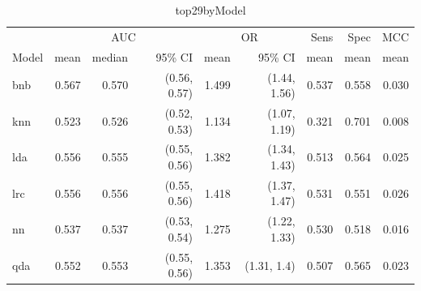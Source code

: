 \begin{table}[H]
\centering
    \begin{footnotesize}
\caption{top29byModel}
\label{tab:top29byModel_m}
\begin{tabular}{l|rrrrrrrr}
\toprule
 & \multicolumn{3}{c|}{AUC} & \multicolumn{2}{c|}{OR} & Sens & Spec & MCC \\ Model & mean & median & 95\% CI & mean & 95\% CI & mean & mean & mean \\ 
\midrule
bnb & {\cellcolor[HTML]{00441B}} \color[HTML]{F1F1F1} 0.567 & {\cellcolor[HTML]{00441B}} \color[HTML]{F1F1F1} 0.570 & (0.56, 0.57) & {\cellcolor[HTML]{00441B}} \color[HTML]{F1F1F1} 1.499 & (1.44, 1.56) & {\cellcolor[HTML]{004C1E}} \color[HTML]{F1F1F1} 0.537 & {\cellcolor[HTML]{CEECC8}} \color[HTML]{000000} 0.558 & {\cellcolor[HTML]{00441B}} \color[HTML]{F1F1F1} 0.030 \\
knn & {\cellcolor[HTML]{F7FCF5}} \color[HTML]{000000} 0.523 & {\cellcolor[HTML]{F7FCF5}} \color[HTML]{000000} 0.526 & (0.52, 0.53) & {\cellcolor[HTML]{F7FCF5}} \color[HTML]{000000} 1.134 & (1.07, 1.19) & {\cellcolor[HTML]{F7FCF5}} \color[HTML]{000000} 0.321 & {\cellcolor[HTML]{00441B}} \color[HTML]{F1F1F1} 0.701 & {\cellcolor[HTML]{F7FCF5}} \color[HTML]{000000} 0.008 \\
lda & {\cellcolor[HTML]{218944}} \color[HTML]{F1F1F1} 0.556 & {\cellcolor[HTML]{39A257}} \color[HTML]{F1F1F1} 0.555 & (0.55, 0.56) & {\cellcolor[HTML]{339C52}} \color[HTML]{F1F1F1} 1.382 & (1.34, 1.43) & {\cellcolor[HTML]{016E2D}} \color[HTML]{F1F1F1} 0.513 & {\cellcolor[HTML]{C7E9C0}} \color[HTML]{000000} 0.564 & {\cellcolor[HTML]{248C46}} \color[HTML]{F1F1F1} 0.025 \\
lrc & {\cellcolor[HTML]{208843}} \color[HTML]{F1F1F1} 0.556 & {\cellcolor[HTML]{349D53}} \color[HTML]{F1F1F1} 0.556 & (0.55, 0.56) & {\cellcolor[HTML]{1A843F}} \color[HTML]{F1F1F1} 1.418 & (1.37, 1.47) & {\cellcolor[HTML]{005522}} \color[HTML]{F1F1F1} 0.531 & {\cellcolor[HTML]{D8F0D2}} \color[HTML]{000000} 0.551 & {\cellcolor[HTML]{117B38}} \color[HTML]{F1F1F1} 0.026 \\
nn & {\cellcolor[HTML]{B2E0AC}} \color[HTML]{000000} 0.537 & {\cellcolor[HTML]{C4E8BD}} \color[HTML]{000000} 0.537 & (0.53, 0.54) & {\cellcolor[HTML]{9CD797}} \color[HTML]{000000} 1.275 & (1.22, 1.33) & {\cellcolor[HTML]{005622}} \color[HTML]{F1F1F1} 0.530 & {\cellcolor[HTML]{F7FCF5}} \color[HTML]{000000} 0.518 & {\cellcolor[HTML]{A3DA9D}} \color[HTML]{000000} 0.016 \\
qda & {\cellcolor[HTML]{38A156}} \color[HTML]{F1F1F1} 0.552 & {\cellcolor[HTML]{48AE60}} \color[HTML]{F1F1F1} 0.553 & (0.55, 0.56) & {\cellcolor[HTML]{4BB062}} \color[HTML]{F1F1F1} 1.353 & (1.31, 1.4) & {\cellcolor[HTML]{0A7633}} \color[HTML]{F1F1F1} 0.507 & {\cellcolor[HTML]{C6E8BF}} \color[HTML]{000000} 0.565 & {\cellcolor[HTML]{369F54}} \color[HTML]{F1F1F1} 0.023 \\

\end{tabular}
\end{footnotesize}
\end{table}

